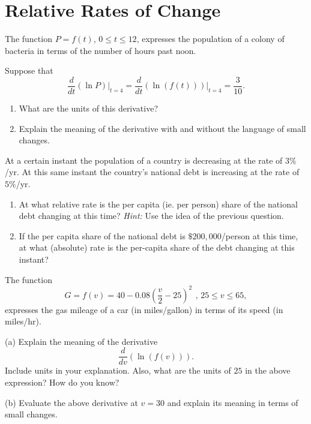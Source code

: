 \documentclass{ximera}
\begin{document}
\section{Relative Rates of Change}

\begin{question}  \label{Qghlvmnvngng}
The function $P=f(t)$, $0\leq t \leq 12$, expresses the population of a colony of bacteria in terms of the number of hours past noon.

Suppose that
\[
   \frac{d}{dt} \left(  \ln P \right)\Big|_{t=4} = \frac{d}{dt} \left(  \ln (f(t)) \right)\Big|_{t=4}  = \frac{3}{10} .
\]

\begin{enumerate}
\item What are the units of this derivative?

\item Explain the meaning of the derivative with and without the language of small changes.
\end{enumerate}
\end{question}

\begin{question} \label{Q34vcvnhh}
At a certain instant the population of a country is decreasing at the rate of $3\%$/yr. At this same instant the country's national debt is increasing at the rate of $5\%$/yr.

\begin{enumerate}
\item At what relative rate is the per capita (ie. per person) share of the national debt changing at this time? \emph{Hint:} Use the idea of the previous question.

\item If the per capita share of the national debt is $\$200,000$/person at this time, at what (absolute) rate is the per-capita share of the debt changing at this instant?

\end{enumerate}
\end{question}


\begin{question}  \label{Qddfdsf4thmm}
The function 
\[ 
      G = f(v) = 40-0.08\left(\frac{v}{2}-25\right)^{2}\, \ , \, 25\leq v\leq 65 ,
\]
expresses the gas mileage of a car (in miles/gallon) in terms of its speed (in miles/hr).

(a) Explain the meaning of the derivative 
\[
     \frac{d}{dv} \left( \ln (f(v)) \right) .
\]
Include units in your explanation. Also, what are the units of $25$ in the above expression? How do you know?

(b) Evaluate the above derivative at $v=30$ and explain its meaning in terms of small changes.

\end{question}
\end{document}
